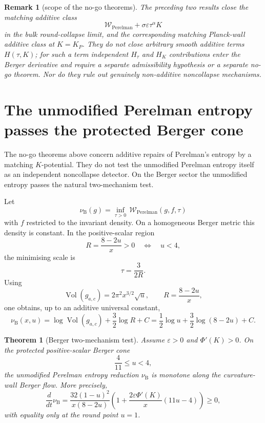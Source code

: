 \documentclass[11pt]{amsart}
\newtheorem{theorem}{Theorem}
\newtheorem{remark}{Remark}
\newcommand{\KP}{K_{\!P}}
\newcommand{\Wcal}{\mathcal W}
\newcommand{\Vol}{\operatorname{Vol}}
\begin{document}
\begin{remark}[scope of the no-go theorems]
The preceding two results close the matching additive class
\[
        \Wcal_{\mathrm{Perelman}}
        +
        \sigma\varepsilon\tau^\alpha K
\]
in the bulk round-collapse limit, and the corresponding matching Planck-wall
additive class at \(K=\KP\).  They do not close arbitrary smooth additive terms
\(H(\tau,K)\); for such a term independent \(H_\tau\) and \(H_K\) contributions
enter the Berger derivative and require a separate admissibility hypothesis or
a separate no-go theorem.  Nor do they rule out genuinely non-additive
noncollapse mechanisms.
\end{remark}





\section{The unmodified Perelman entropy passes the protected Berger cone}

The no-go theorems above concern additive repairs of Perelman's entropy by a
matching \(K\)-potential.  They do not test the unmodified Perelman entropy
itself as an independent noncollapse detector.  On the Berger sector the
unmodified entropy passes the natural two-mechanism test.

Let
\[
        \nu_{\mathrm B}(g)
        =
        \inf_{\tau>0}\,
        \Wcal_{\mathrm{Perelman}}(g,f,\tau)
\]
with \(f\) restricted to the invariant density.  On a homogeneous Berger
metric this density is constant.  In the positive-scalar region
\[
        R=\frac{8-2u}{x}>0
        \quad\Longleftrightarrow\quad
        u<4,
\]
the minimising scale is
\[
        \tau=\frac{3}{2R}.
\]
Using
\[
        \Vol(g_{a,c})=2\pi^2x^{3/2}\sqrt u,
        \qquad
        R=\frac{8-2u}{x},
\]
one obtains, up to an additive universal constant,
\[
        \nu_{\mathrm B}(x,u)
        =
        \log\Vol(g_{a,c})+\frac32\log R+C
        =
        \frac12\log u+\frac32\log(8-2u)+C .
\]

\begin{theorem}[Berger two-mechanism test]
Assume \(\varepsilon>0\) and \(\Phi'(K)>0\).  On the protected
positive-scalar Berger cone
\[
        \frac4{11}\le u<4,
\]
the unmodified Perelman entropy reduction \(\nu_{\mathrm B}\) is monotone along
the curvature-wall Berger flow.  More precisely,
\[
        \frac{d}{dt}\nu_{\mathrm B}
        =
        \frac{32(1-u)^2}{x(8-2u)}
        \left(
        1+\frac{2\varepsilon\Phi'(K)}{x}(11u-4)
        \right)
        \ge0,
\]
with equality only at the round point \(u=1\).
\end{theorem}
\end{document}
